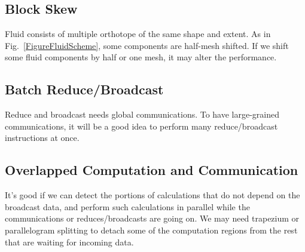 \documentclass[twocolumn]{article}
\begin{document}
\subsection{Block Skew}
Fluid consists of multiple orthotope of the same shape and extent. As in
Fig.~\ref{FigureFluidScheme}, some components are half-mesh shifted. If we
shift some fluid components by half or one mesh, it may alter the performance.



\subsection{Batch Reduce/Broadcast}
Reduce and broadcast needs global communications. To have large-grained
communications, it will be a good idea to perform many reduce/broadcast
instructions at once. 

\subsection{Overlapped Computation and Communication}

It's good if we can detect the portions of calculations that do not depend on
the broadcast data, and perform such calculations in parallel while the
communications or reduces/broadcasts are going on. We may need trapezium or
parallelogram splitting to detach some of the computation regions from the
rest that are waiting for incoming data.


\end{document}

